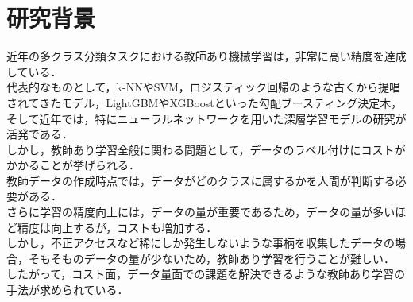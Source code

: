 \section{研究背景}

近年の多クラス分類タスクにおける教師あり機械学習は，非常に高い精度を達成している．\\
代表的なものとして，k-NNやSVM，ロジスティック回帰のような古くから提唱されてきたモデル，LightGBM\cite{lightgbm}やXGBoostといった勾配ブースティング決定木，そして近年では，特にニューラルネットワークを用いた深層学習モデルの研究が活発である．\\
しかし，教師あり学習全般に関わる問題として，データのラベル付けにコストがかかることが挙げられる．\\
教師データの作成時点では，データがどのクラスに属するかを人間が判断する必要がある．\\
さらに学習の精度向上には，データの量が重要であるため，データの量が多いほど精度は向上するが，コストも増加する．\\
しかし，不正アクセスなど稀にしか発生しないような事柄を収集したデータの場合，そもそものデータの量が少ないため，教師あり学習を行うことが難しい．\\
したがって，コスト面，データ量面での課題を解決できるような教師あり学習の手法が求められている．\\

